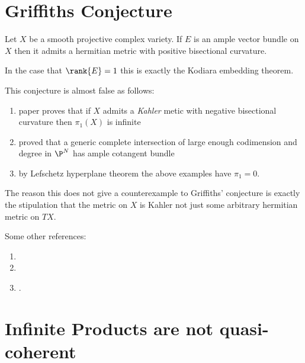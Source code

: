 \documentclass[12pt]{article}
\begin{document}
\section{Griffiths Conjecture}

\begin{conj}
Let $X$ be a smooth projective complex variety. If $E$ is an ample vector bundle on $X$ then it admits a hermitian metric with positive bisectional curvature.
\end{conj}

\begin{rmk}
In the case that $\rank{E} = 1$ this is exactly the Kodiara embedding theorem. 
\end{rmk}

\begin{rmk}
This conjecture is almost false as follows: 
\begin{enumerate}
\item {} paper proves that if $X$ admits a \textit{Kahler} metic with negative bisectional curvature then $\pi_1(X)$ is infinite
\item {} proved that a generic complete intersection of large enough codimension and degree in $\P^N$ has ample cotangent bundle
\item by Lefschetz hyperplane theorem the above examples have $\pi_1 = 0$. 
\end{enumerate}
The reason this does not give a counterexample to Griffiths' conjecture is exactly the stipulation that the metric on $X$ is Kahler not just some arbitrary hermitian metric on $T X$. 
\end{rmk}

Some other references:

\begin{enumerate}
\item {}
\item {}

\item {}. 
\end{enumerate}

\section{Infinite Products are not quasi-coherent}
\end{document}
